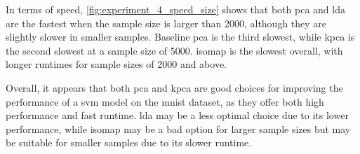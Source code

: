 In terms of speed, \ref{fig:experiment_4_speed_size} shows that both \gls{pca} and \gls{lda} are the fastest when the sample size is larger than 2000, although they are slightly slower in smaller samples. Baseline \gls{pca} is the third slowest, while \gls{kpca} is the second slowest at a sample size of 5000. \gls{isomap} is the slowest overall, with longer runtimes for sample sizes of 2000 and above.

Overall, it appears that both \gls{pca} and \gls{kpca} are good choices for improving the performance of a  \gls{svm} model on the \gls{mnist} dataset, as they offer both high performance and fast runtime. \gls{lda} may be a less optimal choice due to its lower performance, while \gls{isomap} may be a bad option for larger sample sizes but may be suitable for smaller samples due to its slower runtime.


